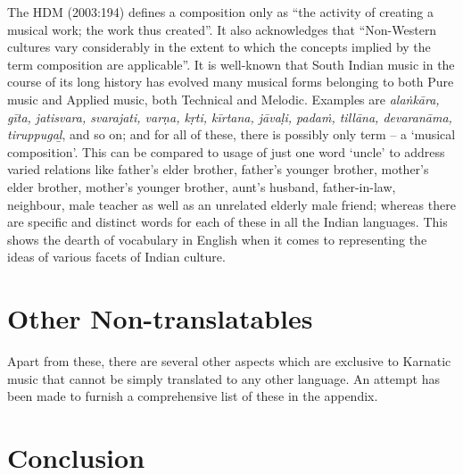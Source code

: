 The HDM (2003:194) defines a composition only as “the activity of creating a musical work; the work thus created”. It also acknowledges that “Non-Western cultures vary considerably in the extent to which the concepts implied by the term composition are applicable”. It is well-known that South Indian music in the course of its long history has evolved many musical forms belonging to both Pure music and Applied music, both Technical and Melodic. Examples are \textit{alaṅkāra, gīta, jatisvara, svarajati, varṇa, kṛti, kīrtana, jāvaḷi, padaṁ, tillāna, devaranāma, tiruppugaḻ}, and so on; and for all of these, there is possibly only term – a ‘musical composition’. This can be compared to usage of just one word ‘uncle’ to address varied relations like father’s elder brother, father’s younger brother, mother’s elder brother, mother’s younger brother, aunt’s husband, father-in-law, neighbour, male teacher as well as an unrelated elderly male friend; whereas there are specific and distinct words for each of these in all the Indian languages. This shows the dearth of vocabulary in English when it comes to representing the ideas of various facets of Indian culture.


\section*{Other Non-translatables}

Apart from these, there are several other aspects which are exclusive to Karnatic music that cannot be simply translated to any other language. An attempt has been made to furnish a comprehensive list of these in the appendix.


\section*{Conclusion}

